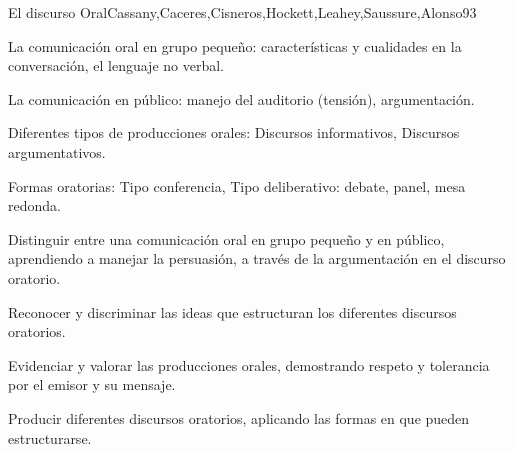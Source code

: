 \begin{syllabus}
\begin{unit}{El discurso Oral}{Cassany,Caceres,Cisneros,Hockett,Leahey,Saussure,Alonso}{9}{3}
\begin{topics}
   \item La comunicación oral en grupo pequeño: características y cualidades en la conversación, el lenguaje no  verbal.
   \item La comunicación en público: manejo del auditorio (tensión), argumentación.
   \item Diferentes tipos de producciones orales: Discursos informativos, Discursos argumentativos.
   \item Formas oratorias: Tipo conferencia, Tipo deliberativo: debate, panel, mesa redonda.
\end{topics}
\begin{learningoutcomes}
   \item Distinguir entre una comunicación oral en grupo pequeño y en público, aprendiendo a manejar la persuasión, a través de la argumentación en el discurso oratorio.
   \item Reconocer y discriminar las ideas que estructuran los diferentes discursos oratorios.
   \item Evidenciar y valorar las producciones orales, demostrando respeto y tolerancia por el emisor y su mensaje.
   \item Producir diferentes discursos oratorios, aplicando las formas en que pueden estructurarse.
\end{learningoutcomes}
\end{unit}



\begin{coursebibliography}
\end{coursebibliography}

\end{syllabus}
